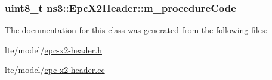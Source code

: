 \subsubsection[{\texorpdfstring{m\+\_\+procedure\+Code}{m_procedureCode}}]{\setlength{\rightskip}{0pt plus 5cm}uint8\+\_\+t ns3\+::\+Epc\+X2\+Header\+::m\+\_\+procedure\+Code\hspace{0.3cm}{\ttfamily [private]}}\hypertarget{classns3_1_1EpcX2Header_aa3338e5efe68ec1867073059e619fe70}{}\label{classns3_1_1EpcX2Header_aa3338e5efe68ec1867073059e619fe70}


The documentation for this class was generated from the following files\+:\begin{DoxyCompactItemize}
\item 
lte/model/\hyperlink{epc-x2-header_8h}{epc-\/x2-\/header.\+h}\item 
lte/model/\hyperlink{epc-x2-header_8cc}{epc-\/x2-\/header.\+cc}\end{DoxyCompactItemize}
